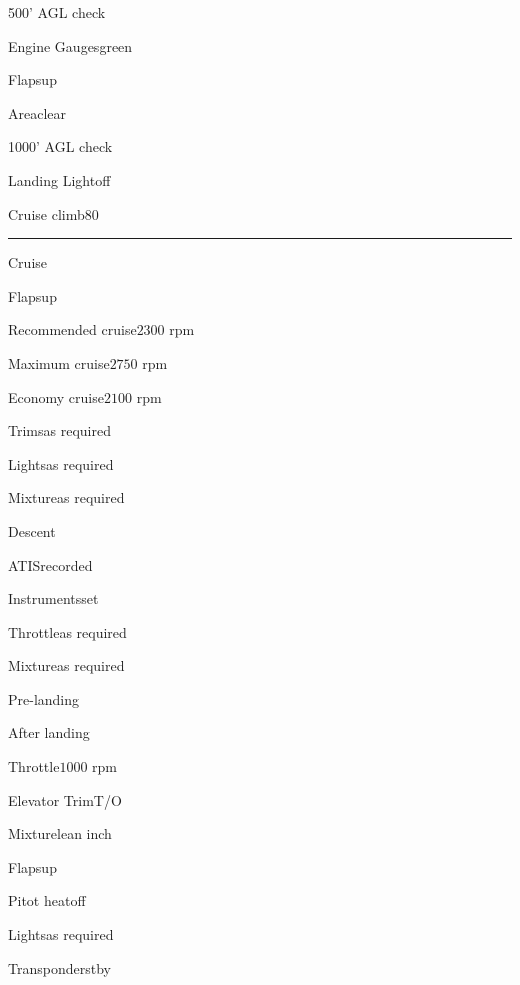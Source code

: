 \pagebreak

\begin{multicols}{2}
\begin{checklist}{500' AGL check}
    \item{Engine Gauges}{green}
    \item{Flaps}{up}
    \item{Area}{clear}
\end{checklist}

\begin{checklist}{1000' AGL check}
    \item{Landing Light}{off}
    \item{Cruise climb}{$80$}
\end{checklist}

\noindent\rule{0.9\linewidth}{0.4pt}
\vspace{0.5em}

\begin{checklist}{Cruise}
    \item{Flaps}{up}
    \item{Recommended cruise}{$2300$ rpm}
    \item{Maximum cruise}{$2750$ rpm}
    \item{Economy cruise}{$2100$ rpm}
    \item{Trims}{as required}
    \item{Lights}{as required}
    \item{Mixture}{as required}
\end{checklist}

\vfill\null
\columnbreak

\begin{checklist}{Descent}
    \item{ATIS}{recorded}
    \item{Instruments}{set}
    \item{Throttle}{as required}
    \item{Mixture}{as required}
\end{checklist}

\begin{checklist}{Pre-landing}
\end{checklist}

\begin{checklist}{After landing}
    \item{Throttle}{$1000$ rpm}
    \item{Elevator Trim}{T/O}
    \item{Mixture}{lean  inch}
    \item{Flaps}{up}
    \item{Pitot heat}{off}
    \item{Lights}{as required}
    \item{Transponder}{stby}
\end{checklist}


\end{multicols}
